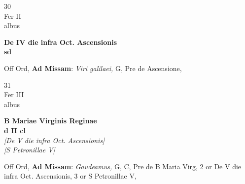 \documentclass[10pt, openany]{book}
\begin{document}
        \begin{center}
            \begin{minipage}{3.5in}
                \vspace{2em}
                \begin{minipage}{0.5in}
                    {\Huge 30} \\
                    {\normalsize Fer II} \\
                    {\normalsize albus}
                \end{minipage}
                \begin{minipage}{3.0in}
                    \textbf{ \large De IV die infra Oct. Ascensionis \\
                    \textnormal{\normalsize sd}} \\ 
                \end{minipage}
                \begin{justify}Off Ord, \textbf{Ad Missam}: \textit{Viri galilaei,} G, Pre de Ascensione,   
                \end{justify}
            \end{minipage}
        \end{center}
    
        \begin{center}
            \begin{minipage}{3.5in}
                \vspace{2em}
                \begin{minipage}{0.5in}
                    {\Huge 31} \\
                    {\normalsize Fer III} \\
                    {\normalsize albus}
                \end{minipage}
                \begin{minipage}{3.0in}
                    \textbf{ \large B Mariae Virginis Reginae \\
                    \textnormal{\normalsize d II cl}} \\ \textit{[De V die infra Oct. Ascensionis]} \\ \textit{[S Petronillae V]} \\ 
                \end{minipage}
                \begin{justify}Off Ord, \textbf{Ad Missam}: \textit{Gaudeamus,} G, C, Pre de B Maria Virg, 2 or De V die infra Oct. Ascensionis, 3 or S Petronillae V,   
                \end{justify}
            \end{minipage}
        \end{center}
    
\end{document}
